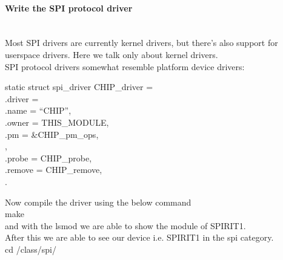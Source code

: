 \paragraph{Write the SPI protocol driver}\\
Most SPI drivers are currently kernel drivers, but there's also support for userspace drivers. Here we talk only about kernel drivers.\\
SPI protocol drivers somewhat resemble platform device drivers:\\
\begin{code}
	static struct spi\_driver CHIP\_driver = \lbrace \\
			.driver = \lbrace \\
			.name		= ``CHIP'',\\
			.owner		= THIS\_MODULE,\\
			.pm		= &CHIP\_pm\_ops,\\
		\rbrace , \\ 
			.probe		= CHIP\_probe,\\
			.remove		= CHIP\_remove,\\
		\rbrace. \\ 
\end{code}
Now compile the driver using the below command \\ make \\ and with the lsmod we are able to show the module of SPIRIT1. \\
After this we are able to see our device i.e. SPIRIT1 in the spi category. \\
cd /class/spi/ \\
